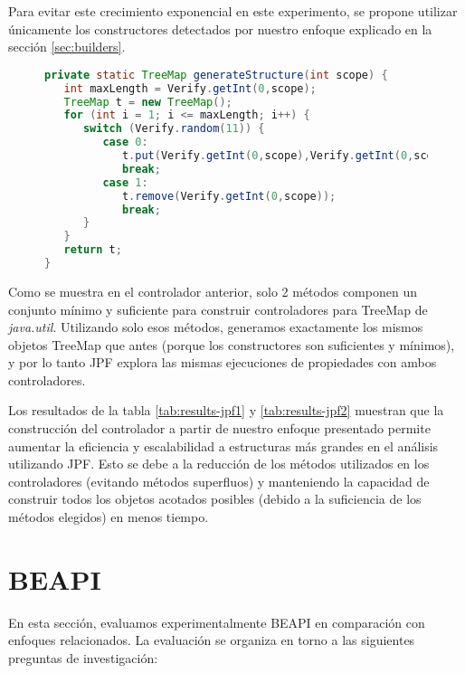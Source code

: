 
Para evitar este crecimiento exponencial en este experimento, se propone utilizar únicamente los constructores detectados por nuestro enfoque explicado en la sección \ref{sec:builders}.
\vspace{5pt} 

\begin{figure}

\begin{lstlisting}[caption={Controlador con métodos constructores},label={lst:driverBLD},language=Java,captionpos=b]
private static TreeMap generateStructure(int scope) {
   int maxLength = Verify.getInt(0,scope);
   TreeMap t = new TreeMap();
   for (int i = 1; i <= maxLength; i++) {
      switch (Verify.random(11)) {
         case 0:
            t.put(Verify.getInt(0,scope),Verify.getInt(0,scope));
            break;
         case 1:
            t.remove(Verify.getInt(0,scope));
            break;						
      }
   }
   return t;
}
\end{lstlisting}
\end{figure}

Como se muestra en el controlador anterior, solo 2 métodos componen un conjunto mínimo y suficiente para construir controladores para TreeMap de \textit{java.util}. Utilizando solo esos métodos, generamos exactamente los mismos objetos TreeMap que antes (porque los constructores son suficientes y mínimos), y por lo tanto JPF explora las mismas ejecuciones de propiedades con ambos controladores.

Los resultados de la tabla \ref{tab:results-jpf1} y \ref{tab:results-jpf2} muestran que la construcción del controlador a partir de nuestro enfoque presentado permite aumentar la eficiencia y escalabilidad a estructuras más grandes en el análisis utilizando JPF. Esto se debe a la reducción de los métodos utilizados en los controladores (evitando métodos superfluos) y manteniendo la capacidad de construir todos los objetos acotados posibles (debido a la suficiencia de los métodos elegidos) en menos tiempo.





\section{BEAPI}
En esta sección, evaluamos experimentalmente \textsf{BEAPI} en comparación con enfoques relacionados. La evaluación se organiza en torno a las siguientes preguntas de investigación:

